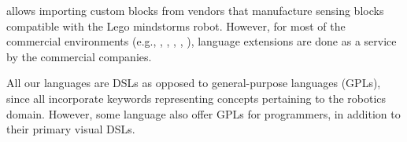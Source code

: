 \lego allows importing custom blocks from vendors that manufacture sensing blocks compatible with the Lego mindstorms robot. However, for most of the commercial environments (e.g., \arcbotics, \edison, \blocklyprop, \vex, \robotmesh), language extensions are done as a service by the commercial companies. %

 All our languages are DSLs as opposed to general-purpose languages (GPLs), since all incorporate keywords representing concepts pertaining to the robotics domain. However, some language also offer GPLs for programmers, in addition to their primary visual DSLs.
